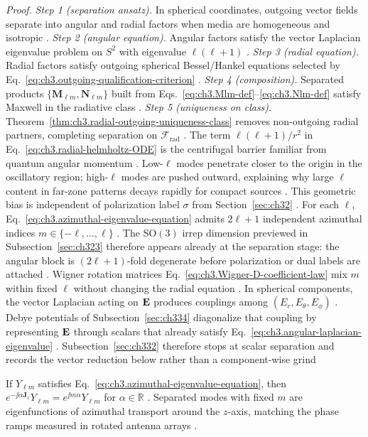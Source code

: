\noindent\textit{Proof.}
\emph{Step 1 (separation ansatz).} In spherical coordinates, outgoing vector fields separate into angular and radial factors when media are homogeneous and isotropic .
\emph{Step 2 (angular equation).} Angular factors satisfy the vector Laplacian eigenvalue problem on \(S^{2}\) with eigenvalue \(\ell(\ell+1)\) .
\emph{Step 3 (radial equation).} Radial factors satisfy outgoing spherical Bessel/Hankel equations selected by Eq.~\eqref{eq:ch3.outgoing-qualification-criterion} .
\emph{Step 4 (composition).} Separated products \(\{\mathbf{M}_{\ell m},\mathbf{N}_{\ell m}\}\) built from Eqs.~\eqref{eq:ch3.Mlm-def}--\eqref{eq:ch3.Nlm-def} satisfy Maxwell in the radiative class .
\emph{Step 5 (uniqueness on class).} Theorem~\ref{thm:ch3.radial-outgoing-uniqueness-class} removes non-outgoing radial partners, completing separation on \(\mathcal{F}_{\mathrm{rad}}\) .
The term \(\ell(\ell+1)/r^{2}\) in Eq.~\eqref{eq:ch3.radial-helmholtz-ODE} is the centrifugal barrier
familiar from quantum angular momentum . Low-\(\ell\) modes penetrate closer to the origin
in the oscillatory region; high-\(\ell\) modes are pushed outward, explaining why large \(\ell\) content in
far-zone patterns decays rapidly for compact sources . This geometric
bias is independent of polarization label \(\sigma\) from Section~\ref{sec:ch32} .
For each \(\ell\), Eq.~\eqref{eq:ch3.azimuthal-eigenvalue-equation} admits \(2\ell+1\) independent azimuthal
indices \(m\in\{-\ell,\ldots,\ell\}\) . The SO\((3)\) irrep dimension previewed
in Subsection~\ref{sec:ch323} therefore appears already at the separation stage: the angular block is
\((2\ell+1)\)-fold degenerate before polarization or dual labels are attached . Wigner
rotation matrices Eq.~\eqref{eq:ch3.Wigner-D-coefficient-law} mix \(m\) within fixed \(\ell\) without changing
the radial equation .
In spherical components, the vector Laplacian acting on \(\mathbf{E}\) produces couplings among
\((E_{r},E_{\theta},E_{\phi})\) . Debye potentials of Subsection~\ref{sec:ch334}
diagonalize that coupling by representing \(\mathbf{E}\) through scalars that already satisfy
Eq.~\eqref{eq:ch3.angular-laplacian-eigenvalue} . Subsection~\ref{sec:ch332} therefore stops at
scalar separation and records the vector reduction below rather than a component-wise grind
\begin{proposition}
\label{prop:ch3.m-conservation-separation}
If \(Y_{\ell m}\) satisfies Eq.~\eqref{eq:ch3.azimuthal-eigenvalue-equation}, then
\(e^{-\jj\alpha\mathbf{J}_{z}}Y_{\ell m}=e^{\jj m\alpha}Y_{\ell m}\) for \(\alpha\in\mathbb{R}\)
. Separated modes with fixed \(m\) are eigenfunctions of azimuthal transport around the
\(z\)-axis, matching the phase ramps measured in rotated antenna arrays .
\end{proposition}
